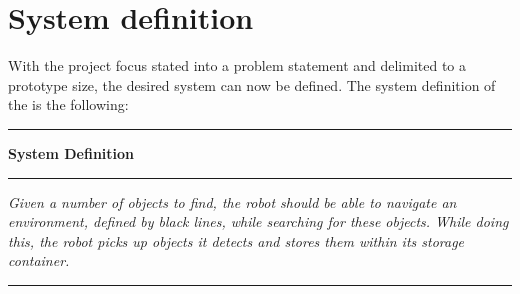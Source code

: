 \section{System definition} \label{sec:system_definition}

With the project focus stated into a problem statement and delimited to a prototype size, the desired system can now be defined. The system definition of the \projname{} is the following:

\begin{table}[H]
	\centering
	\begin{narrow}{1cm}{1cm}

	\rule{\linewidth}{0.035cm}
	\begin{center}
	\textbf{System Definition} 
	\end{center}
	\rule{\linewidth}{0.035cm}
    
	\medskip\noindent \textit{Given a number of objects to find, the robot should be able to navigate an environment, defined by black lines, while searching for these objects. While doing this, the robot picks up objects it detects and stores them within its storage container.}

	\rule{\linewidth}{0.035cm}
    \label{sec:systemdefinition}
	\end{narrow}
\end{table}

